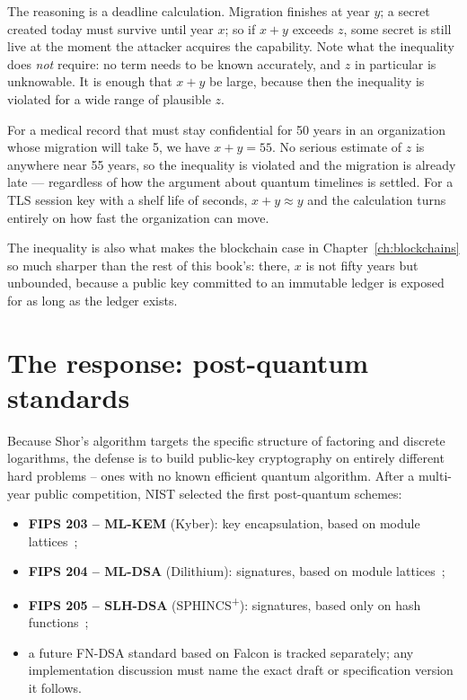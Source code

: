 The reasoning is a deadline calculation. Migration finishes at year $y$; a secret
created today must survive until year $x$; so if $x + y$ exceeds $z$, some secret
is still live at the moment the attacker acquires the capability. Note what the
inequality does \emph{not} require: no term needs to be known accurately, and $z$
in particular is unknowable. It is enough that $x + y$ be large, because then the
inequality is violated for a wide range of plausible $z$.

\begin{example}
For a medical record that must stay confidential for 50 years in an organization
whose migration will take 5, we have $x + y = 55$. No serious estimate of $z$ is
anywhere near 55 years, so the inequality is violated and the migration is
already late --- regardless of how the argument about quantum timelines is
settled. For a TLS session key with a shelf life of seconds, $x + y \approx y$
and the calculation turns entirely on how fast the organization can move.
\end{example}

The inequality is also what makes the blockchain case in
Chapter~\ref{ch:blockchains} so much sharper than the rest of this book's:
there, $x$ is not fifty years but unbounded, because a public key committed to an
immutable ledger is exposed for as long as the ledger exists.

\section{The response: post-quantum standards}

Because Shor's algorithm targets the specific structure of factoring and discrete logarithms, the defense is to build public-key cryptography on entirely different hard problems -- ones with no known efficient quantum algorithm. After a multi-year public competition, NIST selected the first post-quantum schemes:

\begin{itemize}
  \item \textbf{FIPS 203 -- ML-KEM} (Kyber): key encapsulation, based on module lattices~\cite{fips203};
  \item \textbf{FIPS 204 -- ML-DSA} (Dilithium): signatures, based on module lattices~\cite{fips204};
  \item \textbf{FIPS 205 -- SLH-DSA} (SPHINCS\textsuperscript{+}): signatures, based only on hash functions~\cite{fips205};
  \item a future FN-DSA standard based on Falcon is tracked separately; any implementation discussion must name the exact draft or specification version it follows.
\end{itemize}

